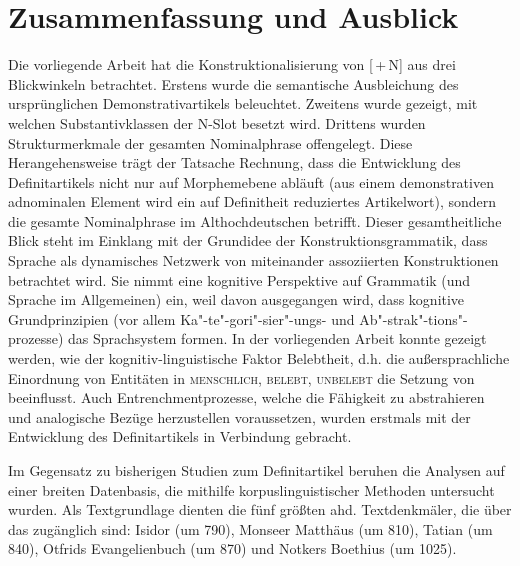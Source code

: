 \chapter{Zusammenfassung und Ausblick}\label{kapitel:zusammenfassung}

Die vorliegende Arbeit hat die Konstruktionalisierung von [\,+\,N] aus drei Blickwinkeln betrachtet. Erstens wurde die semantische Ausbleichung des ursprünglichen Demonstrativartikels beleuchtet. Zweitens wurde gezeigt, mit welchen Substantivklassen der N-Slot besetzt wird. Drittens wurden Strukturmerkmale der gesamten Nominalphrase offengelegt. 
Diese Herangehensweise trägt der Tatsache Rechnung, dass die Entwicklung des Definitartikels nicht nur auf Morphemebene abläuft (aus einem demonstrativen adnominalen Element wird ein auf Definitheit reduziertes Artikelwort), sondern die gesamte Nominalphrase im Althochdeutschen betrifft. Dieser gesamtheitliche Blick steht im Einklang mit der Grundidee der Konstruktionsgrammatik, dass Sprache als dynamisches Netzwerk von miteinander assoziierten Konstruktionen betrachtet wird. Sie nimmt eine kognitive Perspektive auf Grammatik (und Sprache im Allgemeinen) ein, weil davon ausgegangen wird, dass kognitive Grundprinzipien (vor allem Ka"-te"-gori"-sier"-ungs- und Ab"-strak"-tions"-prozesse) das Sprachsystem formen. In der vorliegenden Arbeit konnte gezeigt werden, wie der kognitiv-linguistische Faktor Belebtheit, d.h. die außersprachliche Einordnung von Entitäten in \textsc{menschlich, belebt, unbelebt} die Setzung von  beeinflusst. Auch Entrenchmentprozesse, welche die Fähigkeit zu abstrahieren und analogische Bezüge herzustellen voraussetzen, wurden erstmals mit der Entwicklung des Definitartikels in Verbindung gebracht.

Im Gegensatz zu bisherigen Studien zum Definitartikel beruhen die Analysen auf einer breiten Datenbasis, die mithilfe korpuslinguistischer Methoden untersucht wurden. Als Textgrundlage dienten die fünf größten ahd. Textdenkmäler, die über das  zugänglich sind: Isidor (um 790), Monseer Matthäus (um 810), Tatian (um 840), Otfrids Evangelienbuch (um 870) und Notkers Boethius (um 1025). 

